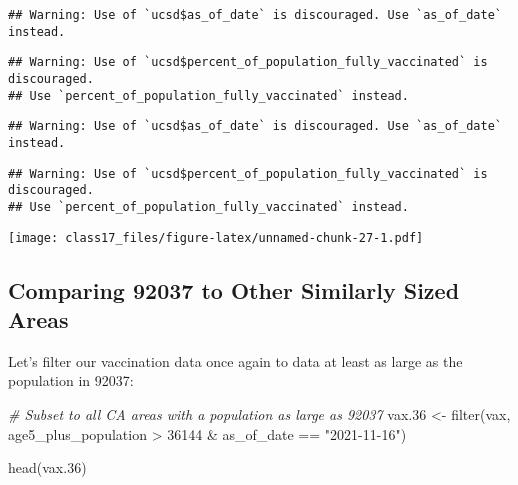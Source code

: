 \documentclass[
]{article}
\newenvironment{Shaded}{\begin{snugshade}}{\end{snugshade}}
\newcommand{\CommentTok}[1]{\textcolor[rgb]{0.56,0.35,0.01}{\textit{#1}}}
\newcommand{\DecValTok}[1]{\textcolor[rgb]{0.00,0.00,0.81}{#1}}
\newcommand{\FloatTok}[1]{\textcolor[rgb]{0.00,0.00,0.81}{#1}}
\newcommand{\FunctionTok}[1]{\textcolor[rgb]{0.00,0.00,0.00}{#1}}
\newcommand{\NormalTok}[1]{#1}
\newcommand{\OtherTok}[1]{\textcolor[rgb]{0.56,0.35,0.01}{#1}}
\newcommand{\SpecialCharTok}[1]{\textcolor[rgb]{0.00,0.00,0.00}{#1}}
\newcommand{\StringTok}[1]{\textcolor[rgb]{0.31,0.60,0.02}{#1}}
\begin{document}
\begin{verbatim}
## Warning: Use of `ucsd$as_of_date` is discouraged. Use `as_of_date` instead.
\end{verbatim}

\begin{verbatim}
## Warning: Use of `ucsd$percent_of_population_fully_vaccinated` is discouraged.
## Use `percent_of_population_fully_vaccinated` instead.
\end{verbatim}

\begin{verbatim}
## Warning: Use of `ucsd$as_of_date` is discouraged. Use `as_of_date` instead.
\end{verbatim}

\begin{verbatim}
## Warning: Use of `ucsd$percent_of_population_fully_vaccinated` is discouraged.
## Use `percent_of_population_fully_vaccinated` instead.
\end{verbatim}

\texttt{[image: class17\_files/figure-latex/unnamed-chunk-27-1.pdf]}

\hypertarget{comparing-92037-to-other-similarly-sized-areas}{%
\subsection{Comparing 92037 to Other Similarly Sized
Areas}\label{comparing-92037-to-other-similarly-sized-areas}}

Let's filter our vaccination data once again to data at least as large
as the population in 92037:

\begin{Shaded}
\begin{Highlighting}[]
\CommentTok{\# Subset to all CA areas with a population as large as 92037}
\NormalTok{vax}\FloatTok{.36} \OtherTok{\textless{}{-}} \FunctionTok{filter}\NormalTok{(vax, age5\_plus\_population }\SpecialCharTok{\textgreater{}} \DecValTok{36144} \SpecialCharTok{\&}
\NormalTok{                as\_of\_date }\SpecialCharTok{==} \StringTok{"2021{-}11{-}16"}\NormalTok{)}

\FunctionTok{head}\NormalTok{(vax}\FloatTok{.36}\NormalTok{)}
\end{Highlighting}
\end{Shaded}
\end{document}
